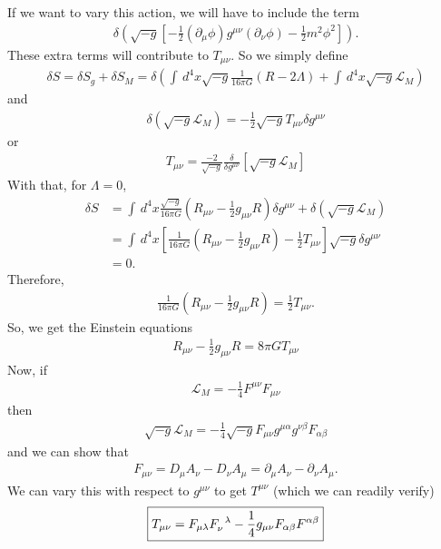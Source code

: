 \documentclass{book}
\numberwithin{equation}{section}
\theoremstyle{definition}
\newcommand{\p}{\partial}
\newcommand{\lag}{\mathcal{L}}
\newcommand{\nn}{\nonumber}
\newcommand{\f}[2]{\frac{#1}{#2}}
\newcommand{\lp}{\left(}
\newcommand{\rp}{\right)}
\newcommand{\lb}{\left[}
\newcommand{\rb}{\right]}
\begin{document}
If we want to vary this action, we will have to include the term
\begin{align}
\delta \lp \sqrt{-g}\lb -\f{1}{2}(\p_\mu\phi)g^{\mu\nu}(\p_\nu\phi) - \f{1}{2}m^2\phi^2 \rb \rp.
\end{align}
These extra terms will contribute to $T_{\mu\nu}$. So we simply define
\begin{align}
\delta S = \delta S_g+ \delta S_M = \delta \lp\int\,d^4x \sqrt{-g}\f{1}{16\pi G}(R - 2\Lambda) + \int\,d^4x \sqrt{-g}\lag_M\rp
\end{align}
and 
\begin{align}
\boxed{\delta \lp \sqrt{-g}\lag_M \rp = -\f{1}{2}\sqrt{-g}T_{\mu\nu}\delta g^{\mu\nu}}
\end{align}
or
\begin{align}
\boxed{T_{\mu\nu} = \f{-2}{\sqrt{-g}}\f{\delta}{\delta g^{\mu\nu}} \lb \sqrt{-g}\lag_M \rb }
\end{align}
With that, for $\Lambda = 0$,
\begin{align}
\delta S &= \int\,d^4x \f{\sqrt{-g}}{16\pi G}\lp R_{\mu\nu} - \f{1}{2}g_{\mu\nu}R \rp \delta g^{\mu\nu} + \delta(\sqrt{-g}\lag_M)\nn\\
&= \int\,d^4x \lb \f{1}{16\pi G}\lp R_{\mu\nu} - \f{1}{2}g_{\mu\nu}R \rp - \f{1}{2}T_{\mu\nu} \rb\sqrt{-g}\delta g^{\mu\nu}\nn\\
&= 0.
\end{align}
Therefore,
\begin{align}
\f{1}{16\pi G}\lp R_{\mu\nu} - \f{1}{2}g_{\mu\nu}R \rp = \f{1}{2}T_{\mu\nu}.
\end{align}
So, we get the Einstein equations
\begin{align}
\boxed{R_{\mu\nu} - \f{1}{2}g_{\mu\nu}R = 8\pi G T_{\mu\nu}}
\end{align}
Now, if 
\begin{align}
\lag_M = -\f{1}{4}F^{\mu\nu}F_{\mu\nu}
\end{align}
then 
\begin{align}\label{em}
\sqrt{-g}\lag_M = -\f{1}{4}\sqrt{-g}F_{\mu\nu}g^{\mu\alpha}g^{\nu\beta}F_{\alpha\beta}
\end{align}
and we can show that
\begin{align}
F_{\mu\nu} = D_{\mu}A_\nu - D_\nu A_\mu = \p_\mu A_\nu - \p_\nu A_\mu.
\end{align}
We can vary this with respect to $g^{\mu\nu}$ to get $T^{\mu\nu}$ (which we can readily verify)
\begin{align}\label{stress}
\boxed{T_{\mu\nu} = F_{\mu\lambda}\tensor{F}{_\nu^\lambda} - \f{1}{4}g_{\mu\nu}F_{\alpha\beta}F^{\alpha\beta}}
\end{align}
\end{document}
